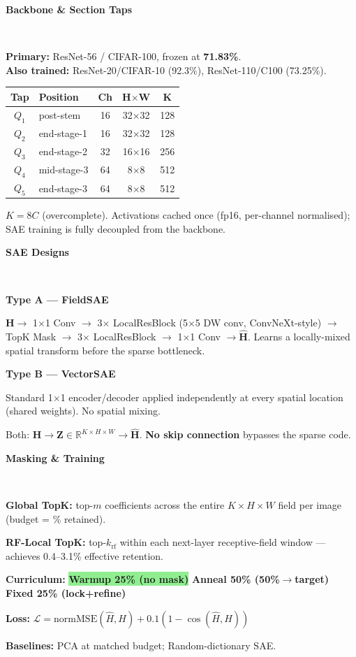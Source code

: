 \documentclass[a0,landscape,final]{a0poster}
\newlength{\colwidth}
\newcommand{\posterblock}[2]{%
  \vspace{0.35cm}%
  \noindent\colorbox{NavyBlue}{\parbox{\dimexpr\colwidth-2\fboxsep}{%
    \color{white}\large\bfseries\vspace{2pt} #1\vspace{2pt}%
  }}\\[-1pt]%
  \noindent\colorbox{PanelBg}{\parbox{\dimexpr\colwidth-2\fboxsep}{%
    \vspace{4pt}#2\vspace{4pt}%
  }}%
  \vspace{0.2cm}%
}
\newcommand{\yes}{\textcolor{ForestGreen}{\checkmark}}
\begin{document}
\posterblock{Backbone \& Section Taps}{%
\normalsize
\textbf{Primary:} ResNet-56 / CIFAR-100, frozen at \textbf{71.83\%}.\\
\textbf{Also trained:} ResNet-20/CIFAR-10 (92.3\%), ResNet-110/C100 (73.25\%).
\medskip

\begin{center}
\begin{tabular}{@{}clccc@{}}
\toprule
\textbf{Tap} & \textbf{Position} & \textbf{Ch} & \textbf{H$\times$W} & \textbf{K}\\
\midrule
$Q_1$ & post-stem     & 16 & 32$\times$32 & 128\\
$Q_2$ & end-stage-1   & 16 & 32$\times$32 & 128\\
$Q_3$ & end-stage-2   & 32 & 16$\times$16 & 256\\
$Q_4$ & mid-stage-3   & 64 &  8$\times$8  & 512\\
$Q_5$ & end-stage-3   & 64 &  8$\times$8  & 512\\
\bottomrule
\end{tabular}
\end{center}

\smallskip
$K=8C$ (overcomplete). Activations cached once (fp16, per-channel
normalised); SAE training is fully decoupled from the backbone.
}

\posterblock{SAE Designs}{%
\normalsize
\textbf{Type A — FieldSAE} \yes\par
$\mathbf{H} \to$ 1$\times$1 Conv $\to$ 3$\times$ LocalResBlock
(5$\times$5 DW conv, ConvNeXt-style) $\to$ TopK Mask $\to$
3$\times$ LocalResBlock $\to$ 1$\times$1 Conv $\to\hat{\mathbf{H}}$.
Learns a locally-mixed spatial transform before the sparse bottleneck.

\medskip
\textbf{Type B — VectorSAE}\par
Standard 1$\times$1 encoder/decoder applied independently at every
spatial location (shared weights). No spatial mixing.

\medskip
Both: $\mathbf{H}\to\mathbf{Z}\in\mathbb{R}^{K\times H\times W}
\to\hat{\mathbf{H}}$. \textbf{No skip connection} bypasses the sparse code.
}

\posterblock{Masking \& Training}{%
\normalsize
\textbf{Global TopK:} top-$m$ coefficients across the entire
$K{\times}H{\times}W$ field per image (budget = \% retained).

\smallskip
\textbf{RF-Local TopK:} top-$k_{\text{rf}}$ within each next-layer
receptive-field window — achieves 0.4--3.1\% effective retention.

\medskip
\textbf{Curriculum:}
\colorbox{LightGreen}{\footnotesize\bfseries Warmup 25\% (no mask)}
\colorbox{LightGold}{\footnotesize\bfseries Anneal 50\% (50\%$\to$target)}
\colorbox{LightOrange}{\footnotesize\bfseries Fixed 25\% (lock+refine)}

\smallskip
\textbf{Loss:} $\mathcal{L} = \mathrm{normMSE}(\hat{H},H) + 0.1(1-\cos(\hat{H},H))$

\medskip
\textbf{Baselines:} PCA at matched budget; Random-dictionary SAE.
}
\end{document}
